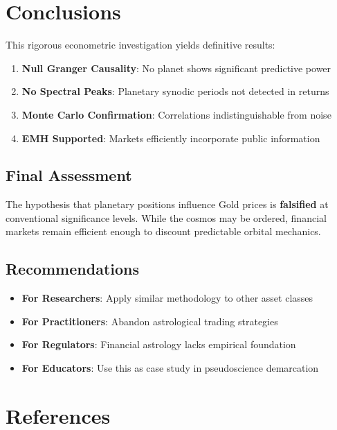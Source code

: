 \documentclass[
  11pt,
  a4paper,
  oneside,
  openany]{article}
\providecommand{\tightlist}{%
  \setlength{\itemsep}{0pt}\setlength{\parskip}{0pt}}\usepackage{longtable,booktabs,array}
\begin{document}
\section{Conclusions}\label{conclusions}

This rigorous econometric investigation yields definitive results:

\begin{enumerate}
\def\labelenumi{\arabic{enumi}.}
\tightlist
\item
  \textbf{Null Granger Causality}: No planet shows significant
  predictive power
\item
  \textbf{No Spectral Peaks}: Planetary synodic periods not detected in
  returns
\item
  \textbf{Monte Carlo Confirmation}: Correlations indistinguishable from
  noise
\item
  \textbf{EMH Supported}: Markets efficiently incorporate public
  information
\end{enumerate}

\subsection{Final Assessment}\label{final-assessment}

The hypothesis that planetary positions influence Gold prices is
\textbf{falsified} at conventional significance levels. While the cosmos
may be ordered, financial markets remain efficient enough to discount
predictable orbital mechanics.

\subsection{Recommendations}\label{recommendations}

\begin{itemize}
\tightlist
\item
  \textbf{For Researchers}: Apply similar methodology to other asset
  classes
\item
  \textbf{For Practitioners}: Abandon astrological trading strategies
\item
  \textbf{For Regulators}: Financial astrology lacks empirical
  foundation
\item
  \textbf{For Educators}: Use this as case study in pseudoscience
  demarcation
\end{itemize}

\section{References}\label{references}
\end{document}
